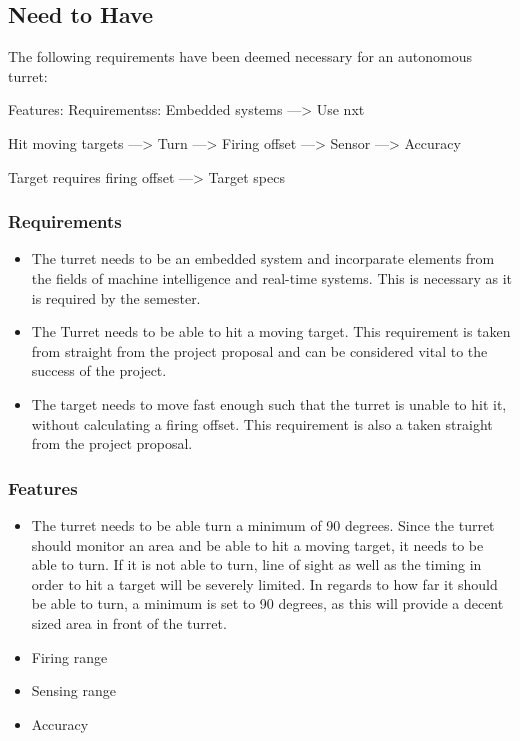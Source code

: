 \subsection{Need to Have}
The following requirements have been deemed necessary for an autonomous turret:

Features:                       Requirementss:
Embedded systems                ---> Use nxt

Hit moving targets              ---> Turn
                                ---> Firing offset
                                ---> Sensor
                                ---> Accuracy

Target requires firing offset   ---> Target specs


\subsubsection{Requirements}
\begin{itemize}
  \item The turret needs to be an embedded system and incorparate elements from
the fields of machine intelligence and real-time systems. This is necessary as
it is required by the semester.
  \item The Turret needs to be able to hit a moving target. This requirement is
taken from straight from the project proposal and can be considered vital to the
success of the project.
\item The target needs to move fast enough such that the turret is unable to
hit it, without calculating a firing offset. This requirement is also a taken
straight from the project proposal.
\end{itemize}

\subsubsection{Features}
\begin{itemize}
  \item The turret needs to be able turn a minimum of 90 degrees. Since the
turret should monitor an area and be able to hit a moving target, it needs to
be able to turn. If it is not able to turn, line of sight as well as the
timing in order to hit a target will be severely limited. In regards to how
far it should be able to turn, a minimum is set to 90 degrees, as this will
provide a decent sized area in front of the turret.
\item Firing range
\item Sensing range
\item Accuracy
\end{itemize}
